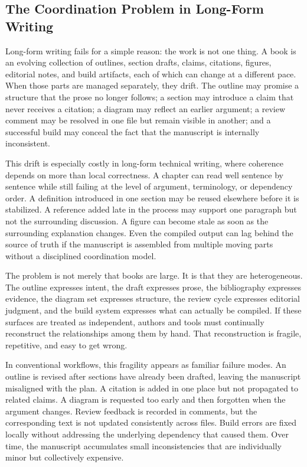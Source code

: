 \documentclass[11pt]{article}
\begin{document}
\subsection{The Coordination Problem in Long-Form Writing}


Long-form writing fails for a simple reason: the work is not one thing. A book is an evolving collection of outlines, section drafts, claims, citations, figures, editorial notes, and build artifacts, each of which can change at a different pace. When those parts are managed separately, they drift. The outline may promise a structure that the prose no longer follows; a section may introduce a claim that never receives a citation; a diagram may reflect an earlier argument; a review comment may be resolved in one file but remain visible in another; and a successful build may conceal the fact that the manuscript is internally inconsistent.

This drift is especially costly in long-form technical writing, where coherence depends on more than local correctness. A chapter can read well sentence by sentence while still failing at the level of argument, terminology, or dependency order. A definition introduced in one section may be reused elsewhere before it is stabilized. A reference added late in the process may support one paragraph but not the surrounding discussion. A figure can become stale as soon as the surrounding explanation changes. Even the compiled output can lag behind the source of truth if the manuscript is assembled from multiple moving parts without a disciplined coordination model.

The problem is not merely that books are large. It is that they are heterogeneous. The outline expresses intent, the draft expresses prose, the bibliography expresses evidence, the diagram set expresses structure, the review cycle expresses editorial judgment, and the build system expresses what can actually be compiled. If these surfaces are treated as independent, authors and tools must continually reconstruct the relationships among them by hand. That reconstruction is fragile, repetitive, and easy to get wrong.

In conventional workflows, this fragility appears as familiar failure modes. An outline is revised after sections have already been drafted, leaving the manuscript misaligned with the plan. A citation is added in one place but not propagated to related claims. A diagram is requested too early and then forgotten when the argument changes. Review feedback is recorded in comments, but the corresponding text is not updated consistently across files. Build errors are fixed locally without addressing the underlying dependency that caused them. Over time, the manuscript accumulates small inconsistencies that are individually minor but collectively expensive.
\end{document}
